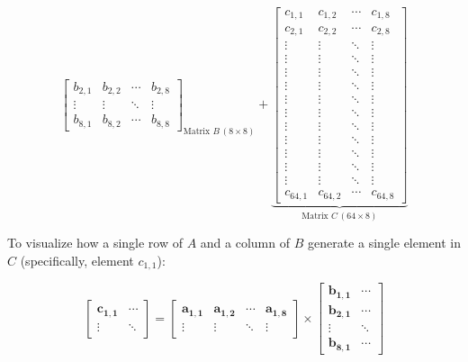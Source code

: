 \documentclass[12pt]{article}
\begin{document}
$${\begin{bmatrix}
b_{2,1} & b_{2,2} & \cdots & b_{2,8} \\
\vdots  & \vdots  & \ddots & \vdots  \\
b_{8,1} & b_{8,2} & \cdots & b_{8,8}
\end{bmatrix}
}_{\text{Matrix } B \, (8 \times 8)}
+
\underbrace{
\begin{bmatrix}
c_{1,1} & c_{1,2} & \cdots & c_{1,8} \\
c_{2,1} & c_{2,2} & \cdots & c_{2,8} \\
\vdots  & \vdots  & \ddots & \vdots  \\
\vdots  & \vdots  & \ddots & \vdots  \\
\vdots  & \vdots  & \ddots & \vdots  \\
\vdots  & \vdots  & \ddots & \vdots  \\
\vdots  & \vdots  & \ddots & \vdots  \\
\vdots  & \vdots  & \ddots & \vdots  \\
\vdots  & \vdots  & \ddots & \vdots  \\
\vdots  & \vdots  & \ddots & \vdots  \\
\vdots  & \vdots  & \ddots & \vdots  \\
\vdots  & \vdots  & \ddots & \vdots  \\
\vdots  & \vdots  & \ddots & \vdots  \\
c_{64,1}& c_{64,2}& \cdots & c_{64,8}
\end{bmatrix}
}_{\text{Matrix } C \, (64 \times 8)}
$$

To visualize how a single row of $A$ and a column of $B$ generate a single element in $C$ (specifically, element $c_{1,1}$):

$$
\begin{bmatrix}
\mathbf{c_{1,1}} & \cdots \\
\vdots & \ddots 
\end{bmatrix}
=
\begin{bmatrix}
\mathbf{a_{1,1}} & \mathbf{a_{1,2}} & \mathbf{\cdots} & \mathbf{a_{1,8}} \\
\vdots & \vdots & \ddots & \vdots 
\end{bmatrix}
\times
\begin{bmatrix}
\mathbf{b_{1,1}} & \cdots \\
\mathbf{b_{2,1}} & \cdots \\
\mathbf{\vdots} & \ddots \\
\mathbf{b_{8,1}} & \cdots 
\end{bmatrix}
$$
\end{document}

